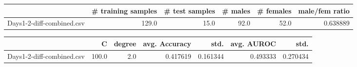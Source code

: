 \begin{tabular}{lrrrrr}
\hline
{} &  \# training samples &  \# test samples &  \# males &  \# females &  male/fem ratio \\
\hline
Days1-2-diff-combined.csv &               129.0 &            15.0 &     92.0 &       52.0 &        0.638889 \\
\hline
\end{tabular}
\begin{tabular}{lrrrrrr}
\hline
{} &      C &  degree &  avg. Accuracy &      std. &  avg. AUROC &      std. \\
\hline
Days1-2-diff-combined.csv &  100.0 &     2.0 &       0.417619 &  0.161344 &    0.493333 &  0.270434 \\
\hline
\end{tabular}

